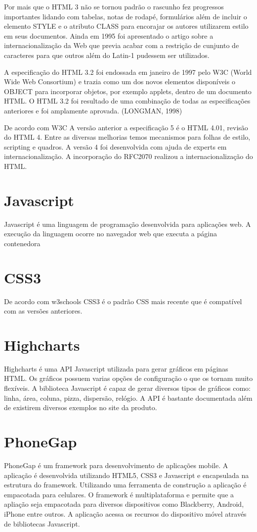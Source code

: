 Por mais que o HTML 3 não se tornou padrão o rascunho fez progressos importantes lidando com tabelas, notas de rodapé, formulários além de incluir o elemento STYLE e o atributo CLASS para encorajar os autores utilizarem estilo em seus documentos. Ainda em 1995 foi apresentado o artigo sobre a internacionalização da Web que previa acabar com a restrição de cunjunto de caracteres para que outros além do Latin-1 pudessem ser utilizados.

A especificação do HTML 3.2 foi endossada em janeiro de 1997 pelo W3C (World Wide Web Consortium) e trazia como um dos novos elementos disponíveis o OBJECT para incorporar objetos, por exemplo applets, dentro de um documento HTML. O HTML 3.2 foi resultado de uma combinação de todas as especificações anteriores e foi amplamente aprovada. (LONGMAN, 1998)

De acordo com W3C A versão anterior a especificação 5 é o HTML 4.01, revisão do HTML 4. Entre as diversas melhorias temos mecanismos para folhas de estilo, scripting e quadros. A versão 4 foi desenvolvida com ajuda de experts em internacionalização. A incorporação do RFC2070 realizou a internacionalização do HTML.

\section{Javascript}
Javascript é uma linguagem de programação desenvolvida para aplicações web. A execução da linguagem ocorre no navegador web que executa a página contenedora

\section{CSS3}
De acordo com w3schools CSS3 é o padrão CSS mais recente que é compatível com as versões anteriores.

\section{Highcharts}
Highcharts é uma API Javascript utilizada para gerar gráficos em páginas HTML. Os gráficos possuem varias opções de configuração o que os tornam muito flexíveis. A biblioteca Javascript é capaz de gerar diversos tipos de gráficos como: linha, área, coluna, pizza, dispersão, relógio. A API é bastante documentada além de existirem diversos exemplos no site da produto.

\section{PhoneGap}
PhoneGap é um framework para desenvolvimento de aplicações mobile. A aplicação é desenvolvida utilizando HTML5, CSS3 e Javascript e encapsulada na estrutura do framework. Utilizando uma ferramenta de construção a aplicação é empacotada para celulares. O framework é multiplataforma e permite que a apliação seja empacotada para diversos dispositivos como Blackberry, Android, iPhone entre outros. A aplicação acessa os recursos do dispositivo móvel através de bibliotecas Javascript.

